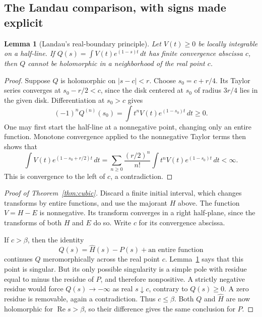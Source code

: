 \documentclass[11pt,a4paper]{article}
\newtheorem{lemma}[theorem]{Lemma}
\theoremstyle{definition}
\theoremstyle{remark}
\numberwithin{equation}{section}
\newcommand{\Rea}{\operatorname{Re}}
\begin{document}
\subsection{The Landau comparison, with signs made explicit}

\begin{lemma}[Landau's real-boundary principle]
\label{lem:landau}
Let \(V(t)\geq0\) be locally integrable on a half-line. If
\(Q(s)=\int V(t)e^{(1-s)t}\,dt\) has finite convergence abscissa
\(c\), then \(Q\) cannot be holomorphic in a neighborhood of the real
point \(c\).
\end{lemma}

\begin{proof}
Suppose \(Q\) is holomorphic on \(|s-c|<r\). Choose
\(s_0=c+r/4\). Its Taylor series converges at \(s_0-r/2<c\), since
the disk centered at \(s_0\) of radius \(3r/4\) lies in the given
disk. Differentiation at \(s_0>c\) gives
\[
 (-1)^n Q^{(n)}(s_0)=\int t^nV(t)e^{(1-s_0)t}\,dt\geq0.
\]
One may first start the half-line at a nonnegative point, changing
only an entire function. Monotone convergence applied to the
nonnegative Taylor terms then shows that
\[
 \int V(t)e^{(1-s_0+r/2)t}\,dt
 =\sum_{n\geq0}\frac{(r/2)^n}{n!}
             \int t^nV(t)e^{(1-s_0)t}\,dt<\infty.
\]
This is convergence to the left of \(c\), a contradiction.
\end{proof}

\begin{proof}[Proof of Theorem~\ref{thm:cubic}]
Discard a finite initial interval, which changes transforms by entire
functions, and use the majorant \(H\) above. The function
\(V=H-E\) is nonnegative. Its transform converges in a right
half-plane, since the transforms of both \(H\) and \(E\) do so.
Write \(c\) for its convergence abscissa.

If \(c>\beta\), then the identity
\[
 Q(s)=\widehat H(s)-P(s)+\text{an entire function}
\]
continues \(Q\) meromorphically across the real point \(c\).
Lemma~\ref{lem:landau} says that this point is singular. But its only
possible singularity is a simple pole with residue equal to minus the
residue of \(P\), and therefore nonpositive. A strictly negative
residue would force \(Q(s)\to-\infty\) as real \(s\downarrow c\),
contrary to \(Q(s)\geq0\). A zero residue is removable, again a
contradiction. Thus \(c\leq\beta\). Both \(Q\) and
\(\widehat H\) are now holomorphic for \(\Rea s>\beta\), so their
difference gives the same conclusion for \(P\).
\end{proof}
\end{document}
